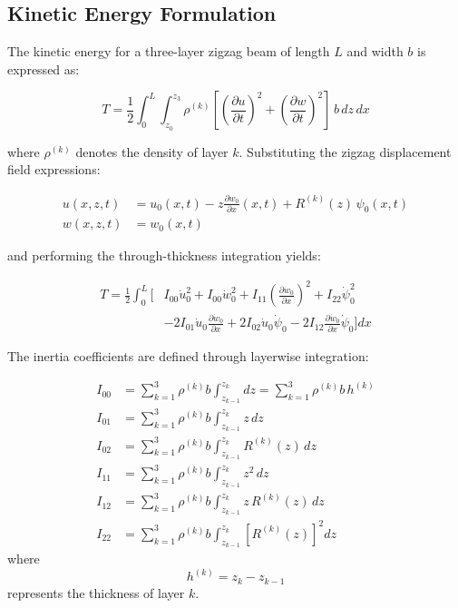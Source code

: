\documentclass[12pt,a4paper]{report}
\begin{document}
\subsection*{Kinetic Energy Formulation}

The kinetic energy for a three-layer zigzag beam of length $L$ and width $b$ is expressed as:

\begin{equation}
T = \frac{1}{2} \int_0^L \int_{z_0}^{z_3} \rho^{(k)} 
\left[ \left(\frac{\partial u}{\partial t}\right)^2 
     + \left(\frac{\partial w}{\partial t}\right)^2 \right] 
\, b \, dz \, dx
\end{equation}

where $\rho^{(k)}$ denotes the density of layer $k$.  
Substituting the zigzag displacement field expressions:

\begin{align}
u(x,z,t) &= u_0(x,t) - z \frac{\partial w_0}{\partial x}(x,t) 
           + R^{(k)}(z) \, \psi_0(x,t) \\[6pt]
w(x,z,t) &= w_0(x,t)
\end{align}

and performing the through-thickness integration yields:

\begin{align}
T = \frac{1}{2} \int_0^L \Big[ & I_{00}\dot{u}_0^2 + I_{00}\dot{w}_0^2 
+ I_{11}\left(\frac{\partial \dot{w}_0}{\partial x}\right)^2 + I_{22}\dot{\psi}_0^2 \nonumber \\
& - 2I_{01}\dot{u}_0\frac{\partial \dot{w}_0}{\partial x} 
+ 2I_{02}\dot{u}_0\dot{\psi}_0 
- 2I_{12}\frac{\partial \dot{w}_0}{\partial x}\dot{\psi}_0 \Big] dx
\end{align}


The inertia coefficients are defined through layerwise integration:

\begin{align}
I_{00} &= \sum_{k=1}^{3} \rho^{(k)} b \int_{z_{k-1}}^{z_k} dz 
       = \sum_{k=1}^{3} \rho^{(k)} b \, h^{(k)} \\[6pt]
I_{01} &= \sum_{k=1}^{3} \rho^{(k)} b \int_{z_{k-1}}^{z_k} z \, dz \\[6pt]
I_{02} &= \sum_{k=1}^{3} \rho^{(k)} b \int_{z_{k-1}}^{z_k} R^{(k)}(z) \, dz \\[6pt]
I_{11} &= \sum_{k=1}^{3} \rho^{(k)} b \int_{z_{k-1}}^{z_k} z^2 \, dz \\[6pt]
I_{12} &= \sum_{k=1}^{3} \rho^{(k)} b \int_{z_{k-1}}^{z_k} z \, R^{(k)}(z) \, dz \\[6pt]
I_{22} &= \sum_{k=1}^{3} \rho^{(k)} b \int_{z_{k-1}}^{z_k} \left[ R^{(k)}(z) \right]^2 dz
\end{align}
where 
\begin{equation}
h^{(k)} = z_k - z_{k-1}
\end{equation}
represents the thickness of layer $k$.
\end{document}
